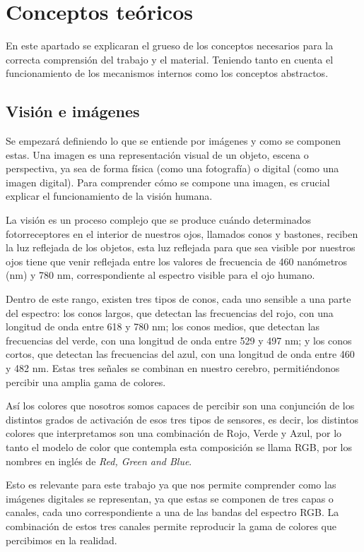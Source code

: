 \chapter{Conceptos teóricos}

En este apartado se explicaran el grueso de los conceptos necesarios para la correcta comprensión del trabajo y el material. Teniendo tanto en cuenta el funcionamiento de los mecanismos internos como los conceptos abstractos.

\section{Visión e imágenes}
Se empezará definiendo lo que se entiende por imágenes y como se componen estas. Una imagen es una representación visual de un objeto, escena o perspectiva, ya sea de forma física (como una fotografía) o digital (como una imagen digital). Para comprender cómo se compone una imagen, es crucial explicar el funcionamiento de la visión humana.

La visión \cite{formaciongraficaModeloRGB} es un proceso complejo que se produce cuándo determinados fotorreceptores en el interior de nuestros ojos, llamados conos y bastones, reciben la luz reflejada de los objetos, esta luz reflejada para que sea visible por nuestros ojos tiene que venir reflejada entre los valores de frecuencia de 460 nanómetros (nm) y 780 nm, correspondiente al espectro visible para el ojo humano. 

Dentro de este rango, existen tres tipos de conos, cada uno sensible a una parte del espectro: los conos largos, que detectan las frecuencias del rojo, con una longitud de onda entre 618 y 780 nm; los conos medios, que detectan las frecuencias del verde, con una longitud de onda entre 529 y 497 nm; y los conos cortos, que detectan las frecuencias del azul, con una longitud de onda entre 460 y 482 nm. Estas tres señales se combinan en nuestro cerebro, permitiéndonos percibir una amplia gama de colores.

Así los colores que nosotros somos capaces de percibir son una conjunción de los distintos grados de activación de esos tres tipos de sensores, es decir, los distintos colores que interpretamos son una combinación de Rojo, Verde y Azul, por lo tanto el modelo de color que contempla esta composición se llama RGB, por los nombres en inglés de \textit{Red, Green and Blue}.

Esto es relevante para este trabajo ya que nos permite comprender como las imágenes digitales se representan, ya que estas se componen de tres capas o canales, cada uno correspondiente a una de las bandas del espectro RGB. La combinación de estos tres canales permite reproducir la gama de colores que percibimos en la realidad.

